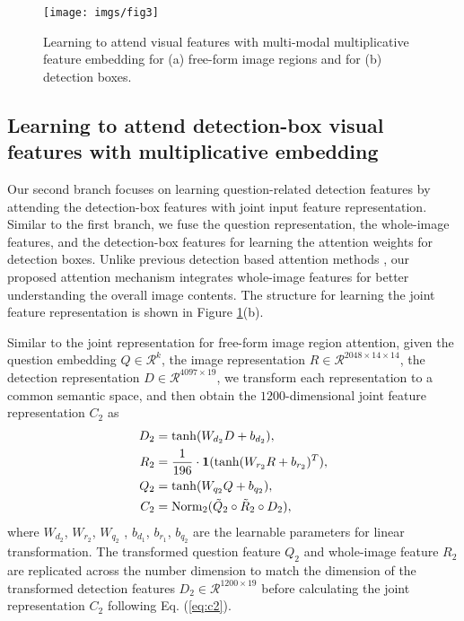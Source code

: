 \documentclass[letterpaper]{article}
\begin{document}
{\begin{figure}[th!]
	\centering
	\texttt{[image: imgs/fig3]}
	\caption{Learning to attend visual features with multi-modal multiplicative feature embedding for (a) free-form image regions and for (b) detection boxes.}
	\label{fig:mmf}
\end{figure}







\subsection{Learning to attend detection-box visual features with multiplicative embedding}\label{33}

Our second branch focuses on learning question-related detection features by attending the detection-box features with joint input feature representation. Similar to the first branch, we fuse the question representation, the whole-image features, and the detection-box features for learning the attention weights for detection boxes. Unlike previous detection based attention methods \cite{shih2016look,li2016visual}, our proposed attention mechanism integrates whole-image features for better understanding the overall image contents. The structure for learning the joint feature representation is shown in Figure \ref{fig:mmf}(b).


Similar to the joint representation for free-form image region attention, given the question embedding $Q \in \mathcal{R}^k$, the image representation $R \in \mathcal{R}^{2048 \times 14 \times 14}$, the detection representation $D \in \mathcal{R}^{4097 \times 19}$, we transform each representation to a common semantic space, and then obtain the $1200$-dimensional joint feature representation $C_2$ as 
\begin{align}
D_2 & = \tanh(W_{d_2}D+b_{d_2}), \\
R_2 & = \frac{1}{196} \cdot {\bf 1} (\tanh(W_{r_2}R+b_{r_2})^T), \\
Q_2 & = \tanh(W_{q_2}Q+b_{q_2}), \\
C_2 & =  \mathrm{Norm_2} (\tilde{Q}_2 \circ \tilde{R}_2 \circ D_2), \label{eq:c2}
\end{align}
where $W_{d_2}$, $W_{r_2}$, $W_{q_2}$ , $b_{d_1}$, $b_{r_1}$, $b_{q_2}$ are the learnable parameters for linear transformation. The transformed question feature $Q_2$ and whole-image feature $R_2$ are replicated across the number dimension to match the dimension of the transformed detection features $D_2 \in  \mathcal{R}^{1200\times 19}$ before calculating the joint representation $C_2$ following Eq. (\ref{eq:c2}).

}
\end{document}
